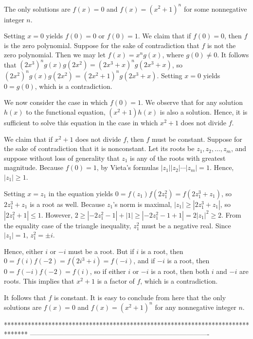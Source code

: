 \begin{solution}
	The only solutions are $f(x) = 0$ and $f(x) = (x^2 + 1)^n$ for some nonnegative integer $n$. 

Setting $x=0$ yields $f(0) = 0$ or $f(0) = 1$. We claim that if $f(0) = 0$, then $f$ is the zero polynomial. Suppose for the sake of contradiction that $f$ is not the zero polynomial. Then we may let $f(x) = x^n g(x)$, where $g(0) \neq 0$. It follows that $(2x^3)^n g(x)g(2x^2) = (2x^3 + x)^n g(2x^3 + x)$, so $(2x^2)^n g(x)g(2x^2) = (2x^2 + 1)^n g(2x^3 + x)$. Setting $x = 0$ yields $0 = g(0)$, which is a contradiction. 

We now consider the case in which $f(0) = 1$. We observe that for any solution $h(x)$ to the functional equation, $(x^2+1) h(x)$ is also a solution. Hence, it is sufficient to solve this equation in the case in which $x^2+1$ does not divide $f$. 

We claim that if $x^2+1$ does not divide $f$, then $f$ must be constant. Suppose for the sake of contradiction that it is nonconstant. Let its roots be $z_1, z_2, \ldots, z_m$, and suppose without loss of generality that $z_1$ is any of the roots with greatest magnitude. Because $f(0) = 1$, by Vieta's formulas $|z_1| |z_2| \cdots |z_m| = 1$. Hence, $|z_1| \geq 1$. 

Setting $x = z_1$ in the equation yields $0 = f(z_1) f(2z_1^2) = f(2z_1^3 + z_1)$, so $2z_1^3 + z_1$ is a root as well. Because $z_1$'s norm is maximal, $|z_1| \geq |2z_1^3 + z_1|$, so $|2z_1^2 + 1| \leq 1$. However, $2 \geq |-2z_1^2 - 1| + |1| \geq |-2z_1^2 - 1 + 1| = 2|z_1|^2 \geq 2$. From the equality case of the triangle inequality, $z_1^2$ must be a negative real. Since $|z_1| = 1$, $z_1^2 = \pm i$. 

Hence, either $i$ or $-i$ must be a root. But if $i$ is a root, then $0 = f(i)f(-2) = f(2i^3 + i) = f(-i)$, and if $-i$ is a root, then $0 = f(-i)f(-2) = f(i)$, so if either $i$ or $-i$ is a root, then both $i$ and $-i$ are roots. This implies that $x^2+1$ is a factor of $f$, which is a contradiction. 

It follows that $f$ is constant. It is easy to conclude from here that the only solutions are $f(x) = 0$ and $f(x) = (x^2 + 1)^n$ for any nonnegative integer $n$.
\end{solution}
*******************************************************************************
-------------------------------------------------------------------------------

